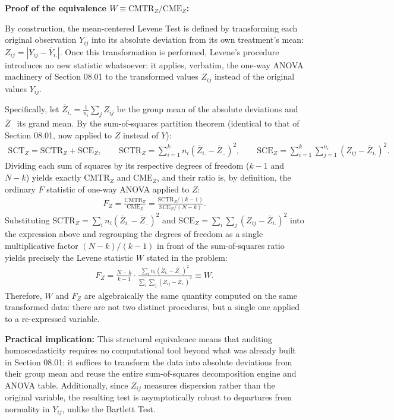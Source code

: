 \begin{solproblema}
	\textbf{Proof of the equivalence $W \equiv \text{CMTR}_Z/\text{CME}_Z$:}

	By construction, the mean-centered Levene Test is defined by transforming each original observation $Y_{ij}$ into its absolute deviation from its own treatment's mean: $Z_{ij} = |Y_{ij} - \bar{Y}_{i.}|$. Once this transformation is performed, Levene's procedure introduces no new statistic whatsoever: it applies, verbatim, the one-way ANOVA machinery of Section 08.01 to the transformed values $Z_{ij}$ instead of the original values $Y_{ij}$.

	Specifically, let $\bar{Z}_{i.} = \frac{1}{n_i}\sum_j Z_{ij}$ be the group mean of the absolute deviations and $\bar{Z}_{..}$ its grand mean. By the sum-of-squares partition theorem (identical to that of Section 08.01, now applied to $Z$ instead of $Y$):
	\begin{align}
		\text{SCT}_Z = \text{SCTR}_Z + \text{SCE}_Z, \qquad \text{SCTR}_Z = \sum_{i=1}^k n_i(\bar{Z}_{i.}-\bar{Z}_{..})^2, \qquad \text{SCE}_Z = \sum_{i=1}^k \sum_{j=1}^{n_i}(Z_{ij}-\bar{Z}_{i.})^2.
	\end{align}
	Dividing each sum of squares by its respective degrees of freedom ($k-1$ and $N-k$) yields exactly $\text{CMTR}_Z$ and $\text{CME}_Z$, and their ratio is, by definition, the ordinary $F$ statistic of one-way ANOVA applied to $Z$:
	\begin{align}
		F_Z = \frac{\text{CMTR}_Z}{\text{CME}_Z} = \frac{\text{SCTR}_Z/(k-1)}{\text{SCE}_Z/(N-k)}.
	\end{align}
	Substituting $\text{SCTR}_Z = \sum_i n_i(\bar{Z}_{i.}-\bar{Z}_{..})^2$ and $\text{SCE}_Z = \sum_i\sum_j (Z_{ij}-\bar{Z}_{i.})^2$ into the expression above and regrouping the degrees of freedom as a single multiplicative factor $(N-k)/(k-1)$ in front of the sum-of-squares ratio yields precisely the Levene statistic $W$ stated in the problem:
	\begin{align}
		F_Z = \frac{N-k}{k-1}\cdot\frac{\sum_i n_i(\bar{Z}_{i.}-\bar{Z}_{..})^2}{\sum_i\sum_j (Z_{ij}-\bar{Z}_{i.})^2} \equiv W.
	\end{align}
	Therefore, $W$ and $F_Z$ are algebraically the same quantity computed on the same transformed data: there are not two distinct procedures, but a single one applied to a re-expressed variable.

	\textbf{Practical implication:} This structural equivalence means that auditing homoscedasticity requires no computational tool beyond what was already built in Section 08.01: it suffices to transform the data into absolute deviations from their group mean and reuse the entire sum-of-squares decomposition engine and ANOVA table. Additionally, since $Z_{ij}$ measures dispersion rather than the original variable, the resulting test is asymptotically robust to departures from normality in $Y_{ij}$, unlike the Bartlett Test.
\end{solproblema}
